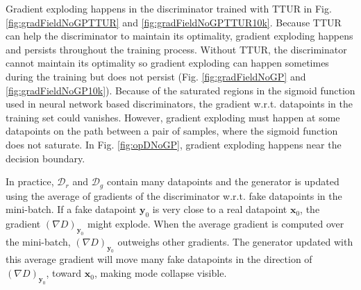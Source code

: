 \documentclass{article} %
\begin{document}
Gradient exploding happens in the discriminator trained with TTUR in Fig. \ref{fig:gradFieldNoGPTTUR} and \ref{fig:gradFieldNoGPTTUR10k}. Because TTUR can help the discriminator to maintain its optimality, gradient exploding happens and persists throughout the training process. Without TTUR, the discriminator cannot maintain its optimality so gradient exploding can happen sometimes during the training but does not persist (Fig. \ref{fig:gradFieldNoGP} and \ref{fig:gradFieldNoGP10k}). 
Because of the saturated regions in the sigmoid function used in neural network based discriminators, the gradient w.r.t. datapoints in the training set could vanishes. However, gradient exploding must happen at some datapoints on the path between a pair of samples, where the sigmoid function does not saturate. In Fig. \ref{fig:opDNoGP}, gradient exploding happens near the decision boundary. 

In practice, $\mathcal{D}_r$ and $\mathcal{D}_g$ contain many datapoints and the generator is updated using the average of gradients of the discriminator w.r.t. fake datapoints in the mini-batch. If a fake datapoint $\bm y_0$ is very close to a real datapoint $\bm x_0$, the gradient $(\nabla D)_{\bm y_0}$ might explode. When the average gradient is computed over the mini-batch, $(\nabla D)_{\bm y_0}$ outweighs other gradients. The generator updated with this average gradient will move many fake datapoints in the direction of $(\nabla D)_{\bm y_0}$, toward $\bm x_0$, making mode collapse visible. 

\end{document}
